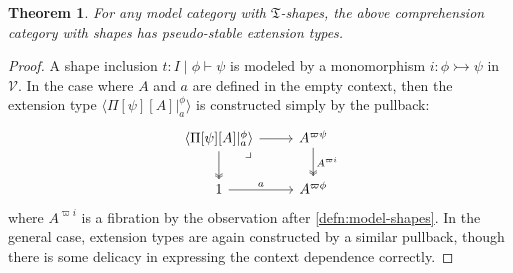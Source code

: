 \documentclass{amsart}
\theoremstyle{plain}
\newtheorem{thm}{Theorem}[section]
\theoremstyle{definition}
\theoremstyle{remark}
\numberwithin{equation}{section}
\newcommand{\ccexten}[4]{\langle\Pi[#1][#2] |^{#3}_{#4}\rangle}
\newcommand{\types}{\vdash}
\newcommand{\V}{\mathcal{V}}
\newcommand{\fT}{\mathfrak{T}}
\begin{document}
\begin{thm}
  For any model category with $\fT$-shapes, the above comprehension category with shapes has pseudo-stable extension types.
\end{thm}
\begin{proof}
A shape inclusion $t:I \mid \phi \types \psi$ is modeled by a monomorphism $i \colon \phi \rightarrowtail \psi$ in $\V$. In the case where $A$ and $a$ are defined in the empty context, then the extension type $\ccexten{\psi}{A}{\phi}{a}$ is constructed simply by the pullback:
 \[
 \begin{tikzcd} {\ccexten{\psi}{A}{\phi}{a}} \arrow[r] \arrow[d, two heads] \arrow[dr, phantom, "\lrcorner" very near start] & A^{\varpi\psi} \arrow[d, two heads, "A^{\varpi i}"] \\ 1 \arrow[r, "a"] & A^{\varpi\phi}
 \end{tikzcd}
 \]
where $A^{\varpi i}$ is a fibration by the observation after \cref{defn:model-shapes}.
In the general case, extension types are again constructed by a similar pullback, though there is some delicacy in expressing the context dependence correctly.


\end{proof}
\end{document}
